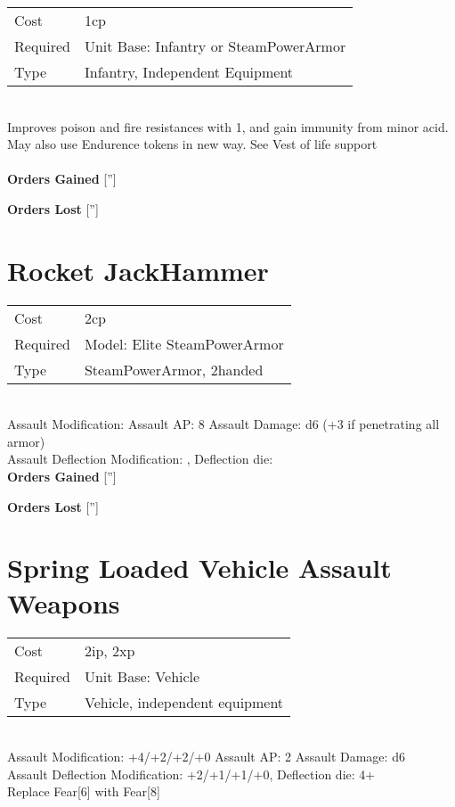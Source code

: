 \begin{tabular}{ll}
    Cost & 1cp \\
    Required & Unit Base: Infantry or SteamPowerArmor\\
    Type & Infantry, Independent Equipment\\
\end{tabular}
\ \\
Improves poison and fire resistances with 1, and gain immunity from minor acid. May also use Endurence tokens in new way. See Vest of life support \\

\ \\

{\bf Orders Gained}
['']

{\bf Orders Lost}
['']
\section{ Rocket JackHammer }

\begin{tabular}{ll}
    Cost & 2cp \\
    Required & Model: Elite SteamPowerArmor\\
    Type & SteamPowerArmor, 2handed\\
\end{tabular}
\ \\
Assault Modification:  Assault AP: 8 Assault Damage: d6 (+3 if penetrating all armor)\\
Assault Deflection Modification: , Deflection die:  \\




{\bf Orders Gained}
['']

{\bf Orders Lost}
['']
\section{ Spring Loaded Vehicle Assault Weapons }

\begin{tabular}{ll}
    Cost & 2ip, 2xp \\
    Required & Unit Base: Vehicle\\
    Type & Vehicle, independent equipment\\
\end{tabular}
\ \\
Assault Modification: +4/+2/+2/+0 Assault AP: 2 Assault Damage: d6\\
Assault Deflection Modification: +2/+1/+1/+0, Deflection die: 4+ \\
Replace Fear[6] with Fear[8]



